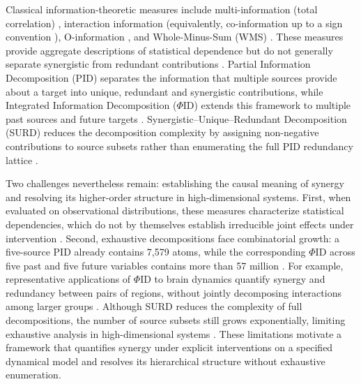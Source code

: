 \documentclass[fleqn,10pt]{wlscirep}
\theoremstyle{naturetheorem}
\begin{document}
Classical information-theoretic measures include multi-information (total correlation) \cite{Watanabe1960MultivariateCorrelation}, interaction information \cite{McGill1954MultivariateInformation} (equivalently, co-information up to a sign convention \cite{Bell2003CoInformationLattice}), O-information \cite{Rosas2019OInformation}, and Whole-Minus-Sum (WMS) \cite{Mediano2019MeasuringIntegratedInformation}. These measures provide aggregate descriptions of statistical dependence but do not generally separate synergistic from redundant contributions \cite{Timme2014MultivariateInformation,Rosas2019OInformation,Mediano2019MeasuringIntegratedInformation}. Partial Information Decomposition (PID) separates the information that multiple sources provide about a target into unique, redundant and synergistic contributions, while Integrated Information Decomposition ($\Phi$ID) extends this framework to multiple past sources and future targets \cite{Williams2010NonnegativeDO,Mediano2025TowardAU}. Synergistic--Unique--Redundant Decomposition (SURD) reduces the decomposition complexity by assigning non-negative contributions to source subsets rather than enumerating the full PID redundancy lattice \cite{MartnezSnchez2024DecomposingCI}.

Two challenges nevertheless remain: establishing the causal meaning of synergy and resolving its higher-order structure in high-dimensional systems. First, when evaluated on observational distributions, these measures characterize statistical dependencies, which do not by themselves establish irreducible joint effects under intervention \cite{Pearl2009CausalII,Oizumi2014FromPhenomenology,Santoro2026ChartingHOI}. Second, exhaustive decompositions face combinatorial growth: a five-source PID already contains 7,579 atoms, while the corresponding $\Phi$ID across five past and five future variables contains more than 57 million \cite{Williams2010NonnegativeDO,Mediano2025TowardAU}. For example, representative applications of $\Phi$ID to brain dynamics quantify synergy and redundancy between pairs of regions, without jointly decomposing interactions among larger groups \cite{luppi2022synergistic,luppi2024synergistic}. Although SURD reduces the complexity of full decompositions, the number of source subsets still grows exponentially, limiting exhaustive analysis in high-dimensional systems \cite{MartnezSnchez2024DecomposingCI}. These limitations motivate a framework that quantifies synergy under explicit interventions on a specified dynamical model and resolves its hierarchical structure without exhaustive enumeration.
\end{document}
